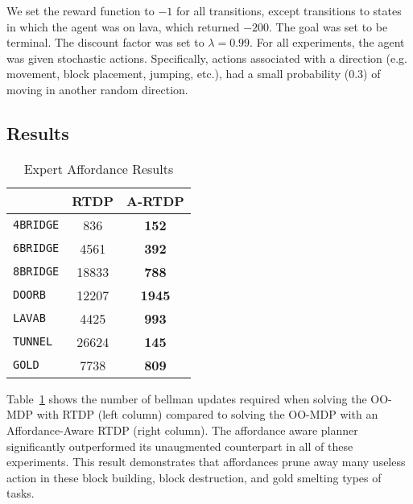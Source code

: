 \documentclass[conference]{IEEEtran}
\begin{document}
We set the reward function to $-1$ for all transitions, except
transitions to states in which the agent was on lava, which returned 
$-200$. The goal was set to be terminal. The discount
factor was set to $\lambda = 0.99$. For all experiments, the agent was given stochastic actions. Specifically, actions associated with a direction (e.g. movement, block placement, jumping, etc.), had a small probability ($0.3$) of moving in another random direction.


\subsection{Results}

\begin{table}
\centering
\caption{Expert Affordance Results}
\begin{tabular}{ l || c c }
  & RTDP & A-RTDP \\ \hline
  \texttt{4BRIDGE}  		& 	836 		& 	{\bf 152} 		\\
  \texttt{6BRIDGE} 		& 	4561 	& 	{\bf 392}   	\\
  \texttt{8BRIDGE} 		& 	18833	& 	{\bf 788}	\\
  \texttt{DOORB} 		& 	12207	& 	{\bf 1945}		\\
  \texttt{LAVAB}  		& 	4425 	& 	{\bf 993}  		\\
  \texttt{TUNNEL}  		& 	26624	& 	{\bf 145}  		\\
  \texttt{GOLD}  		& 	7738 	& 	{\bf 809}  	
\end{tabular}
\label{table:blocks}
\label{table:hard-results}
\end{table}

Table~\ref{table:hard-results} shows the number of bellman updates required when solving the OO-MDP with RTDP (left column)
compared to solving the OO-MDP with an Affordance-Aware RTDP (right column).  The
affordance aware planner significantly outperformed its unaugmented
counterpart in all of these experiments. This
result demonstrates that affordances prune away many useless action in
these block building, block destruction, and gold smelting types of
tasks. 
\end{document}
